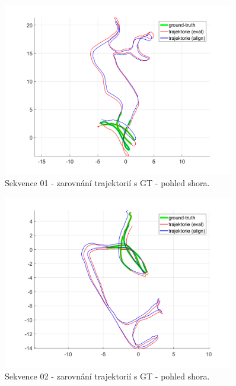 \documentclass[12pt,a4paper]{report}
\begin{document}
\begin{figure}[H]
\centering
\includegraphics[width=0.9\textwidth]{img/m_dso_01_2.png}
\caption{Sekvence 01 - zarovnání trajektorií s GT - pohled shora.}
\label{22}
\end{figure}

\begin{figure}[H]
\centering
\includegraphics[width=0.9\textwidth]{img/m_dso_02_2.png}
\caption{Sekvence 02 - zarovnání trajektorií s GT - pohled shora.}
\label{23}
\end{figure}
\end{document}
